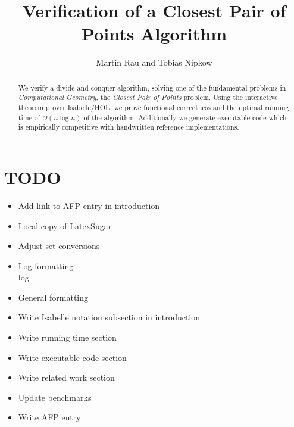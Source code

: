 \documentclass{llncs}
\begin{document}
\title{Verification of a Closest Pair of Points Algorithm}
\author{Martin Rau and Tobias Nipkow}
\date{}
\maketitle

\begin{abstract}
We verify a divide-and-conquer algorithm, solving one of the fundamental problems
in \textit{Computational Geometry}, the \textit{Closest Pair of Points} problem.
Using the interactive theorem prover Isabelle/HOL, we prove functional correctness
and the optimal running time of $\mathcal{O}(n \log n)$ of the algorithm. 
Additionally we generate executable code which is empirically competitive with handwritten
 reference implementations.
\end{abstract}


\section{TODO}

\begin{itemize}
\item Add link to AFP entry in introduction \\
\item Local copy of LatexSugar \\
\item Adjust set conversions \\
\item Log formatting \\log \\
\item General formatting \\
\item Write Isabelle notation subsection in introduction \\
\item Write running time section \\
\item Write executable code section \\
\item Write related work section \\
\item Update benchmarks \\
\item Write AFP entry \\
\end{itemize}
\end{document}
